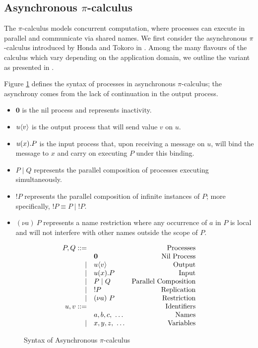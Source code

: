 \subsection{Asynchronous $\pi$-calculus}\label{section_async}

The $\pi$-calculus models concurrent computation, where processes can execute in parallel and communicate via shared names.
We first consider the asynchronous $\pi$-calculus introduced by Honda and Tokoro in \cite{AsyncHonda}.
Among the many flavours of the calculus which vary depending on the application domain, we outline the variant as presented in \cite{C406Lecture}. 

Figure \ref{fig:async} defines the syntax of processes in asynchronous $\pi$-calculus; the asynchrony comes from the lack of continuation in the output process.

\begin{itemize}
\item $\mathbf{0}$ is the nil process and represents inactivity.
\item ${{u}\langle {v} \rangle}$ is the output process that will send value $v$ on $u$.
\item ${{u}({x})}.P$ is the input process that, upon receiving a message on $u$, will bind the message to $x$ and carry on executing $P$ under this binding.
\item $P\mid Q$ represents the parallel composition of processes executing simultaneously.
\item $!P$ represents the parallel composition of infinite instances of $P$; more specifically, $!P \equiv P \mid {!P}$.
\item $(\nu a)~P$ represents a name restriction where any occurrence of $a$ in $P$ is local and will not interfere with other names outside the scope of $P$.
\end{itemize}


\begin{figure}[!hb]
\doublespacing
\[
\begin{array}{rlr}

P,Q ::= & & \text{Processes} \\
     & \mathbf{0} & \text{Nil Process} \\
\mid & {{u}\langle {v} \rangle} & \text{Output} \\
\mid & {{u}({x})}.P & \text{Input} \\     
\mid & P \mid Q & \text{Parallel Composition} \\
\mid & !P & \text{Replication} \\
\mid & (\nu a)~P & \text{Restriction} \\

u,v ::= & & \text{Identifiers} \\
     & a, b, c,~\dots & \text{Names} \\
\mid & x, y, z,~\dots & \text{Variables} \\

\end{array}
\]
\singlespacing
\caption{Syntax of Asynchronous $\pi$-calculus}
\label{fig:async}
\end{figure}

